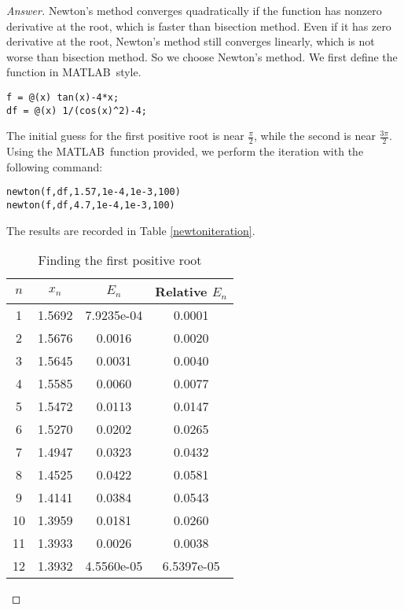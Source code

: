 \begin{proof}[Answer]
Newton's method converges quadratically if the function has nonzero derivative at the root, which is faster than bisection method.
Even if it has zero derivative at the root, Newton's method still converges linearly, which is not worse than bisection method.
So we choose Newton's method.
We first define the function in MATLAB\texttrademark\ style.
\begin{lstlisting}[style=Matlab-editor]
f = @(x) tan(x)-4*x;
df = @(x) 1/(cos(x)^2)-4;
\end{lstlisting}
The initial guess for the first positive root is near \(\frac{\pi}{2}\), while the second is near \(\frac{3\pi}{2}\).
Using the MATLAB\texttrademark\ function provided, we perform the iteration with the following command:
\begin{lstlisting}[style=Matlab-editor]
newton(f,df,1.57,1e-4,1e-3,100)
newton(f,df,4.7,1e-4,1e-3,100)
\end{lstlisting}
The results are recorded in Table \ref{newtoniteration}.
\ifnum{}
	\begin{table}[H]
	\centering
	\begin{subtable}[t]{.8\textwidth}
\else
	\begin{table}[htbp]
	\begin{subtable}[t]{.48\linewidth}
\fi
		\centering
		\caption{Finding the first positive root}
		\begin{tabular}[t]{|c|c|c|c|}
		\hline
		$n$ & \(x_n\) & \(E_n\) & Relative \(E_n\) \\	\hline
		1	&	1.5692	&	7.9235e-04	&	0.0001\\	\hline
		2	&	1.5676	&	0.0016	&	0.0020	\\	\hline
		3	&	1.5645	&	0.0031	&	0.0040	\\	\hline
		4	&	1.5585	&	0.0060	&	0.0077	\\	\hline
		5	&	1.5472	&	0.0113	&	0.0147	\\	\hline
		6	&	1.5270	&	0.0202	&	0.0265	\\	\hline
		7	&	1.4947	&	0.0323	&	0.0432	\\	\hline
		8	&	1.4525	&	0.0422	&	0.0581	\\	\hline
		9	&	1.4141	&	0.0384	&	0.0543	\\	\hline
		10	&	1.3959	&	0.0181	&	0.0260	\\	\hline
		11	&	1.3933	&	0.0026	&	0.0038	\\	\hline
		12	&	1.3932	&	4.5560e-05	&	6.5397e-05	\\	\hline

\end{tabular}
\end{subtable}
\end{table}
\end{subtable}
\end{table}
\end{proof}
